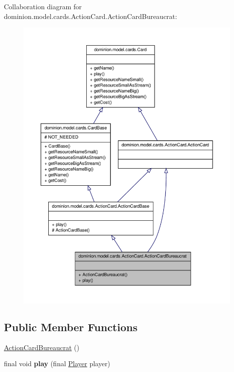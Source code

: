 \-Collaboration diagram for dominion.\-model.\-cards.\-Action\-Card.\-Action\-Card\-Bureaucrat\-:
\nopagebreak
\begin{figure}[H]
\begin{center}
\leavevmode
\includegraphics[width=350pt]{classdominion_1_1model_1_1cards_1_1ActionCard_1_1ActionCardBureaucrat__coll__graph}
\end{center}
\end{figure}
\subsection*{\-Public \-Member \-Functions}
\begin{DoxyCompactItemize}
\item 
\hyperlink{classdominion_1_1model_1_1cards_1_1ActionCard_1_1ActionCardBureaucrat_aed1084c5a36841c8e838c0d4d4704dfa}{\-Action\-Card\-Bureaucrat} ()
\item 
\hypertarget{classdominion_1_1model_1_1cards_1_1ActionCard_1_1ActionCardBureaucrat_aa887e69b6aa71f46b3193b2ac76881b2}{final void {\bfseries play} (final \hyperlink{interfacedominion_1_1model_1_1Player}{\-Player} player)}\label{classdominion_1_1model_1_1cards_1_1ActionCard_1_1ActionCardBureaucrat_aa887e69b6aa71f46b3193b2ac76881b2}

\end{DoxyCompactItemize}


